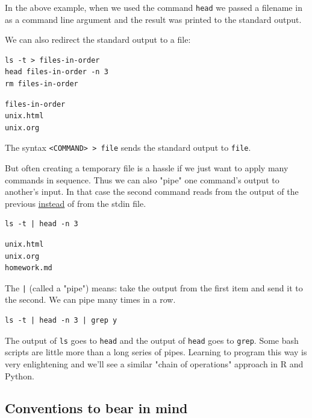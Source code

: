 \documentclass[11pt]{article}
\begin{document}
In the above example, when we used the command \texttt{head} we passed a
filename in as a command line argument and the result was printed to
the standard output.

We can also redirect the standard output to a file:

\begin{verbatim}
ls -t > files-in-order
head files-in-order -n 3
rm files-in-order
\end{verbatim}

\begin{verbatim}
files-in-order
unix.html
unix.org
\end{verbatim}

The syntax \texttt{<COMMAND> > file} sends the standard output to \texttt{file}.

But often creating a temporary file is a hassle if we just want to
apply many commands in sequence. Thus we can also "pipe" one command's
output to another's input. In that case the second command reads from
the output of the previous \uline{instead} of from the stdin file.

\begin{verbatim}
ls -t | head -n 3
\end{verbatim}

\begin{verbatim}
unix.html
unix.org
homework.md
\end{verbatim}

The \texttt{|} (called a "pipe") means: take the output from the first item
and send it to the second. We can pipe many times in a row.

\begin{verbatim}
ls -t | head -n 3 | grep y
\end{verbatim}

The output of \texttt{ls} goes to \texttt{head} and the output of \texttt{head} goes to
\texttt{grep}. Some bash scripts are little more than a long series of
pipes. Learning to program this way is very enlightening and we'll see
a similar "chain of operations" approach in R and Python.

\subsection{Conventions to bear in mind}
\label{sec:orgc9ef043}
\end{document}
